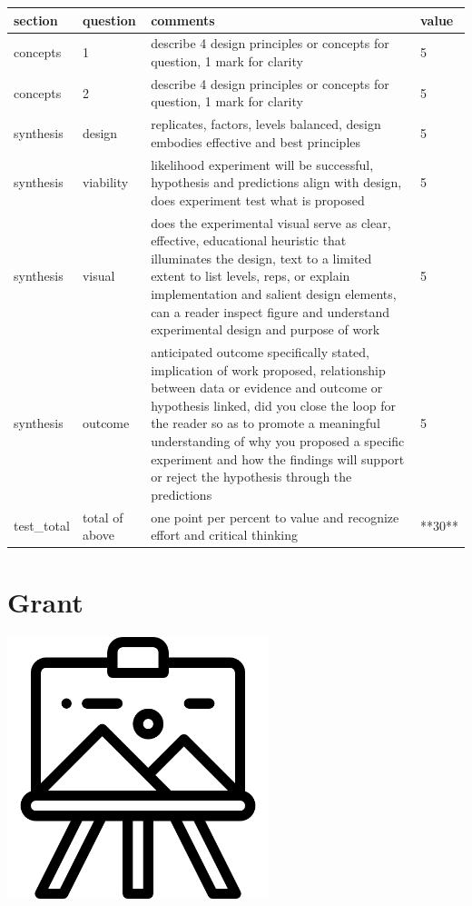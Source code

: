 \documentclass[
]{book}
\begin{document}
\begin{tabular}{l|l|l|l}
\hline
section & question & comments & value\\
\hline
concepts & 1 & describe 4 design principles or concepts for question, 1 mark for clarity & 5\\
\hline
concepts & 2 & describe 4 design principles or concepts for question, 1 mark for clarity & 5\\
\hline
synthesis & design & replicates, factors, levels balanced, design embodies effective and best principles & 5\\
\hline
synthesis & viability & likelihood experiment will be successful, hypothesis and predictions align with design, does experiment test what is proposed & 5\\
\hline
synthesis & visual & does the experimental visual serve as clear, effective, educational heuristic that illuminates the design, text to a limited extent to list levels, reps, or explain implementation and salient design elements, can a reader inspect figure and understand experimental design and purpose of work & 5\\
\hline
synthesis & outcome & anticipated outcome specifically stated, implication of work proposed, relationship between data or evidence and outcome or hypothesis linked, did you close the loop for the reader so as to promote a meaningful understanding of why you proposed a specific experiment and how the findings will support or reject the hypothesis through the predictions & 5\\
\hline
test\_total & total of above & one point per percent to value and recognize effort and critical thinking & **30**\\
\hline
\end{tabular}

\hypertarget{grant}{%
\chapter{Grant}\label{grant}}

\includegraphics[width=3in,height=\textheight]{./grant.png}
\end{document}
